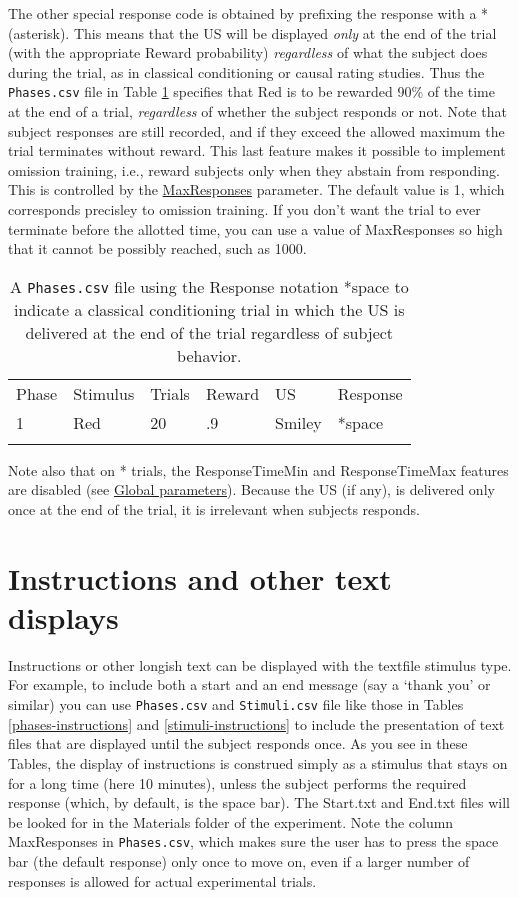 \documentclass[11pt,]{article}
\renewcommand{\medskip}{}
\begin{document}
The other special response code is obtained by prefixing the response
with a * (asterisk). This means that the US will be displayed
\emph{only} at the end of the trial (with the appropriate Reward
probability) \emph{regardless} of what the subject does during the
trial, as in classical conditioning or causal rating studies. Thus the
\texttt{Phases.csv} file in Table \ref{classical} specifies that Red is
to be rewarded 90\% of the time at the end of a trial, \emph{regardless}
of whether the subject responds or not. Note that subject responses are
still recorded, and if they exceed the allowed maximum the trial
terminates without reward. This last feature makes it possible to
implement omission training, i.e., reward subjects only when they
abstain from responding. This is controlled by the
\hyperref[maxresponses]{MaxResponses} parameter. The default value is 1,
which corresponds precisley to omission training. If you don't want the
trial to ever terminate before the allotted time, you can use a value of
MaxResponses so high that it cannot be possibly reached, such as 1000.

\begin{longtable}[c]{@{}llllll@{}}
\hline\noalign{\medskip}
Phase & Stimulus & Trials & Reward & US & Response
\\\noalign{\medskip}
\hline\noalign{\medskip}
1 & Red & 20 & .9 & Smiley & *space
\\\noalign{\medskip}
\hline
\noalign{\medskip}
\caption{A \texttt{Phases.csv} file using the Response notation *space
to indicate a classical conditioning trial in which the US is delivered
at the end of the trial regardless of subject behavior.
\label{classical}}
\end{longtable}

Note also that on * trials, the ResponseTimeMin and ResponseTimeMax
features are disabled (see \hyperref[global]{Global parameters}).
Because the US (if any), is delivered only once at the end of the trial,
it is irrelevant when subjects responds.

\section{Instructions and other text displays}

Instructions or other longish text can be displayed with the textfile
stimulus type. For example, to include both a start and an end message
(say a `thank you' or similar) you can use \texttt{Phases.csv} and
\texttt{Stimuli.csv} file like those in Tables \ref{phases-instructions}
and \ref{stimuli-instructions} to include the presentation of text files
that are displayed until the subject responds once. As you see in these
Tables, the display of instructions is construed simply as a stimulus
that stays on for a long time (here 10 minutes), unless the subject
performs the required response (which, by default, is the space bar).
The Start.txt and End.txt files will be looked for in the Materials
folder of the experiment. Note the column MaxResponses in
\texttt{Phases.csv}, which makes sure the user has to press the space
bar (the default response) only once to move on, even if a larger number
of responses is allowed for actual experimental trials.
\end{document}
